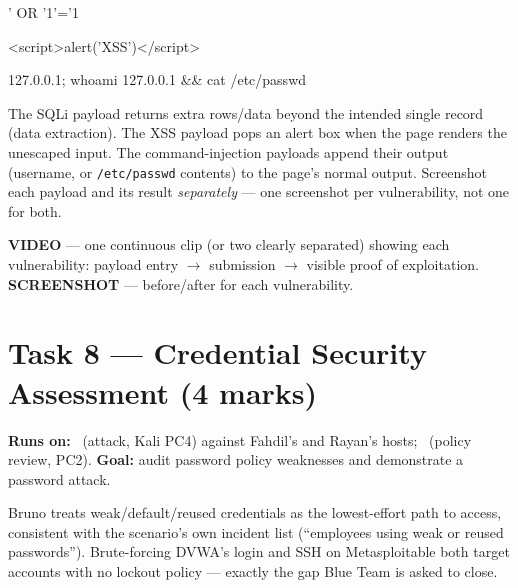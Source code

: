 \documentclass[11pt,a4paper]{article}
\begin{document}
\begin{cmdbox}
\begin{cmdverb}
' OR '1'='1
\end{cmdverb}
\end{cmdbox}

\begin{cmdbox}
\begin{cmdverb}
<script>alert('XSS')</script>
\end{cmdverb}
\end{cmdbox}

\begin{cmdbox}
\begin{cmdverb}
127.0.0.1; whoami
127.0.0.1 && cat /etc/passwd
\end{cmdverb}
\end{cmdbox}

\begin{expectbox}
The SQLi payload returns extra rows/data beyond the intended single record (data
extraction). The XSS payload pops an alert box when the page renders the unescaped
input. The command-injection payloads append their output (username, or
\texttt{/etc/passwd} contents) to the page's normal output. Screenshot each payload and
its result \emph{separately} --- one screenshot per vulnerability, not one for both.
\end{expectbox}

\begin{notebox}
\textbf{VIDEO} --- one continuous clip (or two clearly separated) showing each
vulnerability: payload entry $\to$ submission $\to$ visible proof of exploitation.
\textbf{SCREENSHOT} --- before/after for each vulnerability.
\end{notebox}

\clearpage

\section{Task 8 --- Credential Security Assessment (4 marks)}
\textbf{Runs on:} \bruno\ (attack, Kali PC4) against Fahdil's and Rayan's hosts;
\fahdil\ (policy review, PC2). \quad\textbf{Goal:} audit password policy weaknesses and
demonstrate a password attack.

\begin{redbox}
Bruno treats weak/default/reused credentials as the lowest-effort path to access,
consistent with the scenario's own incident list (``employees using weak or reused
passwords''). Brute-forcing DVWA's login and SSH on Metasploitable both target
accounts with no lockout policy --- exactly the gap Blue Team is asked to close.
\end{redbox}
\end{document}
